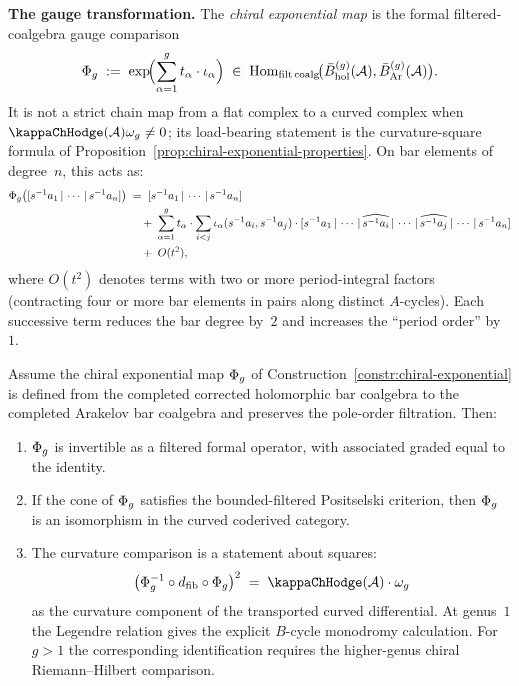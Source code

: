 \begin{construction}
\smallskip\noindent
\textbf{The gauge transformation.}
The \emph{chiral exponential map} is the formal filtered-coalgebra
gauge comparison
\begin{equation}\label{eq:chiral-exp-def}
\Phi_g
\;:=\;
\exp\!\Bigl(\sum_{\alpha=1}^{g}
t_\alpha \cdot \iota_\alpha\Bigr)
\;\in\;
\operatorname{Hom}_{\mathrm{filt\,coalg}}\!\bigl(
\bar{B}_{\mathrm{hol}}^{(g)}(\mathcal{A}),
\bar{B}_{\mathrm{Ar}}^{(g)}(\mathcal{A})\bigr).
\end{equation}
It is not a strict chain map from a flat complex to a curved
complex when $\kappaChHodge(\cA)\omega_g\neq 0$; its load-bearing
statement is the curvature-square formula of
Proposition~\ref{prop:chiral-exponential-properties}.
On bar elements of degree~$n$, this acts as:
\begin{align}\label{eq:chiral-exp-expansion}
\Phi_g\bigl([s^{-1}a_1 \,|\, \cdots \,|\, s^{-1}a_n]\bigr)
&\;=\;
[s^{-1}a_1 \,|\, \cdots \,|\, s^{-1}a_n]
\notag\\
&\quad\;+\;
\sum_{\alpha=1}^{g} t_\alpha \cdot
\sum_{i < j}
\iota_\alpha(s^{-1}a_i, s^{-1}a_j)
\cdot
[s^{-1}a_1 \,|\, \cdots \,|\,
 \widehat{s^{-1}a_i} \,|\, \cdots \,|\,
 \widehat{s^{-1}a_j} \,|\, \cdots \,|\,
 s^{-1}a_n]
\notag\\
&\quad\;+\;
O(t^2),
\end{align}
where $O(t^2)$ denotes terms with two or more period-integral
factors (contracting four or more bar elements in pairs along
distinct $A$-cycles). Each successive term reduces the bar
degree by~$2$ and increases the ``period order'' by~$1$.
\end{construction}

\begin{proposition}
\label{prop:chiral-exponential-properties}
Assume the chiral exponential map $\Phi_g$ of
Construction~\textup{\ref{constr:chiral-exponential}} is defined
from the completed corrected holomorphic bar coalgebra to the
completed Arakelov bar coalgebra and preserves the pole-order
filtration. Then:
\begin{enumerate}[label=\textup{(\roman*)}]
\item $\Phi_g$ is invertible as a filtered formal operator, with
 associated graded equal to the identity.
\item If the cone of $\Phi_g$ satisfies the bounded-filtered
 Positselski criterion, then $\Phi_g$ is an isomorphism in the
 curved coderived category.
\item The curvature comparison is a statement about squares:
 \begin{equation}\label{eq:conjugation-formula}
 \bigl(\Phig^{-1} \circ \dfib \circ \Phig\bigr)^2
 \;=\;
 \kappaChHodge(\cA) \cdot \omega_g
 \end{equation}
 as the curvature component of the transported curved
 differential. At genus~$1$ the Legendre relation gives the
 explicit $B$-cycle monodromy calculation. For $g>1$ the
 corresponding identification requires the higher-genus chiral
 Riemann--Hilbert comparison.
\end{enumerate}
\end{proposition}


